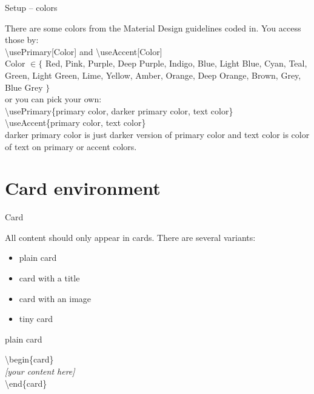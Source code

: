 \documentclass[9pt, aspectratio=169]{beamer}
\begin{document}
\begin{frame}{Setup -- colors}
\begin{card}
There are some colors from the Material Design guidelines coded in. You access those by: \\[2mm]
{\color{primary} \textbackslash usePrimary[Color]} and {\color{primary}\textbackslash useAccent[Color]}\\[2mm]
{\tiny {\color{primary}Color} $\in \{$ Red, Pink, Purple, Deep Purple, Indigo, Blue, Light Blue, Cyan, Teal, Green, Light Green, Lime, Yellow, Amber, Orange, Deep Orange, Brown, Grey, Blue Grey $\}$} \\[2mm]
or you can pick your own:\\[2mm]
{\color{primary} \textbackslash usePrimary\{primary color, darker primary color, text color\}}
{\color{primary} \textbackslash useAccent\{primary color, text color\}}\\[2mm]
{\color{primary} darker primary color} is just darker version of {\color{primary} primary color} and {\color{primary} text color} is color of text on {\color{primary} primary} or {\color{primary} accent colors}.
\end{card}
\end{frame}

\section{Card environment}
\begin{frame}{Card}
\begin{card}
All content should only appear in cards. There are several variants:
\begin{itemize}
\item plain card
\item card with a title
\item card with an image
\item tiny card
\end{itemize}
\end{card}
\end{frame}

\begin{frame}{plain card}
\begin{card}
\end{card}

\begin{card}
{\color{primary} \textbackslash begin\{card\}\\[2mm]}
\null\qquad \textit{[your content here]}\\[2mm]
{\color{primary} \textbackslash end\{card\}}
\end{card}
\end{frame}
\end{document}
